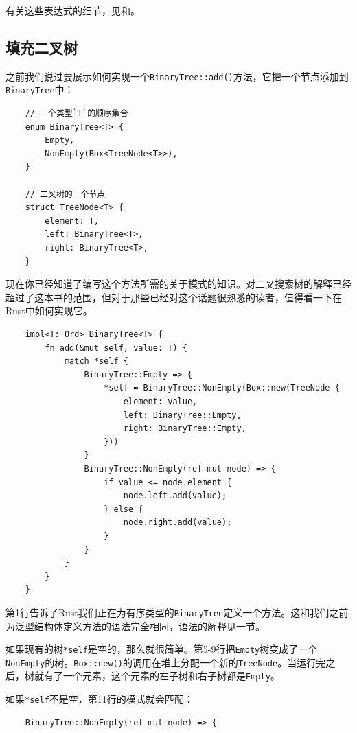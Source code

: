 有关这些表达式的细节，见和。

\subsection{填充二叉树}\label{BinaryTree}
之前我们说过要展示如何实现一个\texttt{BinaryTree::add()}方法，它把一个节点添加到\\
\texttt{BinaryTree}中：
\begin{verbatim}
    // 一个类型`T`的顺序集合
    enum BinaryTree<T> {
        Empty,
        NonEmpty(Box<TreeNode<T>>),
    }

    // 二叉树的一个节点
    struct TreeNode<T> {
        element: T,
        left: BinaryTree<T>,
        right: BinaryTree<T>,
    }
\end{verbatim}

现在你已经知道了编写这个方法所需的关于模式的知识。对二叉搜索树的解释已经超过了这本书的范围，但对于那些已经对这个话题很熟悉的读者，值得看一下在Rust中如何实现它。

\begin{verbatim}
    impl<T: Ord> BinaryTree<T> {
        fn add(&mut self, value: T) {
            match *self {
                BinaryTree::Empty => {
                    *self = BinaryTree::NonEmpty(Box::new(TreeNode {
                        element: value,
                        left: BinaryTree::Empty,
                        right: BinaryTree::Empty,
                    }))
                }
                BinaryTree::NonEmpty(ref mut node) => {
                    if value <= node.element {
                        node.left.add(value);
                    } else {
                        node.right.add(value);
                    }
                }
            }
        }
    }    
\end{verbatim}

第1行告诉了Rust我们正在为有序类型的\texttt{BinaryTree}定义一个方法。这和我们之前为泛型结构体定义方法的语法完全相同，语法的解释见一节。

如果现有的树\texttt{*self}是空的，那么就很简单。第5-9行把\texttt{Empty}树变成了一个\texttt{NonEmpty}的树。\texttt{Box::new()}的调用在堆上分配一个新的\texttt{TreeNode}。当运行完之后，树就有了一个元素，这个元素的左子树和右子树都是\texttt{Empty}。

如果\texttt{*self}不是空，第11行的模式就会匹配：
\begin{verbatim}
    BinaryTree::NonEmpty(ref mut node) => {
\end{verbatim}

